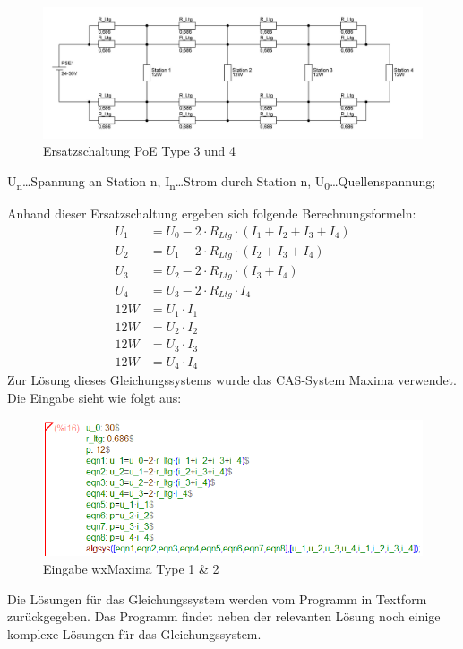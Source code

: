 \begin{figure}[H]
	\centering
	\includegraphics[width=\linewidth]{images/berechnung/poe4pair_neu.jpg}
	\caption{Ersatzschaltung PoE Type 3 und 4}
\end{figure}
U\textsubscript{n}\dots Spannung an Station n, I\textsubscript{n}\dots Strom durch Station n, U\textsubscript{0}\dots Quellenspannung;\par
Anhand dieser Ersatzschaltung ergeben sich folgende Berechnungsformeln:
\begin{align}
	U_1 &= U_0-2\cdot R_{Ltg}\cdot (I_1+I_2+I_3+I_4)\\
	U_2 &= U_1-2\cdot R_{Ltg}\cdot (I_2+I_3+I_4)\\
	U_3 &= U_2-2\cdot R_{Ltg}\cdot (I_3+I_4)\\
	U_4 &= U_3-2\cdot R_{Ltg}\cdot I_4\\
	12W &= U_1\cdot I_1\\
	12W &= U_2\cdot I_2\\
	12W &= U_3\cdot I_3\\
	12W &= U_4\cdot I_4
\end{align}
Zur Lösung dieses Gleichungssystems wurde das CAS-System Maxima verwendet.
Die Eingabe sieht wie folgt aus:
\begin{figure}[H]
	\centering
	\includegraphics[width=.9\linewidth]{images/berechnung/max_2pair_30V.png}
	\caption{Eingabe wxMaxima Type 1 \& 2}
\end{figure}
Die Lösungen für das Gleichungssystem werden vom Programm in Textform zurückgegeben.
Das Programm findet neben der relevanten Lösung noch einige komplexe Lösungen für das Gleichungssystem.
